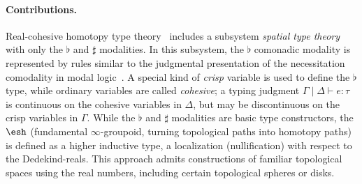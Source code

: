 \documentclass{article}
\begin{document}
  


\paragraph{Contributions.} Real-cohesive homotopy type
theory~\citep{Shulman2015} includes a subsystem \emph{spatial type theory} with
only the $\flat$ and $\sharp$ modalities. In this subsystem, the $\flat$
comonadic modality is represented by rules similar to the judgmental
presentation of the necessitation comodality in modal
logic~\citep{Pfenning2001}. A special kind of \emph{crisp} variable is used to
define the $\flat$ type, while ordinary variables are called \emph{cohesive}; a
typing judgment $\Gamma \mid \Delta \vdash e : \tau$ is continuous on the
cohesive variables in $\Delta$, but may be discontinuous on the crisp variables
in $\Gamma$. While the $\flat$ and $\sharp$ modalities are basic type
constructors, the $\shape$ (fundamental $\infty$-groupoid, turning topological
paths into homotopy paths) is defined as a higher inductive type, a localization
(nullification) with respect to the Dedekind-reals. This approach admits
constructions of familiar topological spaces using the real numbers, including
certain topological spheres or disks.
\end{document}
